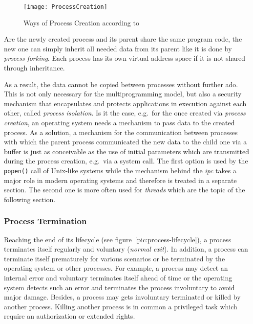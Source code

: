 \begin{figure} [t]
	\centering
	\texttt{[image: ProcessCreation]}
	\caption{Ways of Process Creation according to~\cite{glatz2015betriebssysteme}}\label{pic:processcreation}
\end{figure}

Are the newly created process and its parent share the same program code, the new one can simply inherit all needed data from its parent like it is done by \textit{process forking}\cite{achilles2006betriebssysteme}.
Each process has its own virtual address space if it is not shared through inheritance.

As a result, the data cannot be copied between processes without further ado.
This is not only necessary for the multiprogramming model, but also a security mechanism that encapsulates and protects applications in execution against each other, called \textit{process isolation}.
Is it the case, e.g.\ for the once created via \textit{process creation}, an operating system needs a mechanism to pass data to the created process.
As a solution, a mechanism for the communication between processes with which the parent process communicated the new data to the child one via a buffer is just as conceivable as the use of initial parameters which are transmitted during the process creation, e.g.\ via a system call\cite{glatz2015betriebssysteme}.
The first option is used by the \texttt{popen()} call of Unix-like systems while the mechanism behind the \textit{\ac{ipc}} takes a major role in modern operating systems and therefore is treated in a separate section.
The second one is more often used for \textit{threads} which are the topic of the following section.

\subsubsection*{Process Termination}
Reaching the end of its lifecycle (see figure~\ref{pic:process-lifecycle}), a process terminates itself regularly and voluntary (\textit{normal exit})\cite{tanenbaum-modern-operating-systems}.
In addition, a process can terminate itself prematurely for various scenarios or be terminated by the operating system or other processes.
For example, a process may detect an internal error and voluntary terminates itself ahead of time or the operating system detects such an error and terminates the process involuntary to avoid major damage\cite{tanenbaum-modern-operating-systems}.
Besides, a process may gets involuntary terminated or killed by another process. 
Killing another process is in common a privileged task which require an authorization or extended rights\cite{tanenbaum-modern-operating-systems}.


